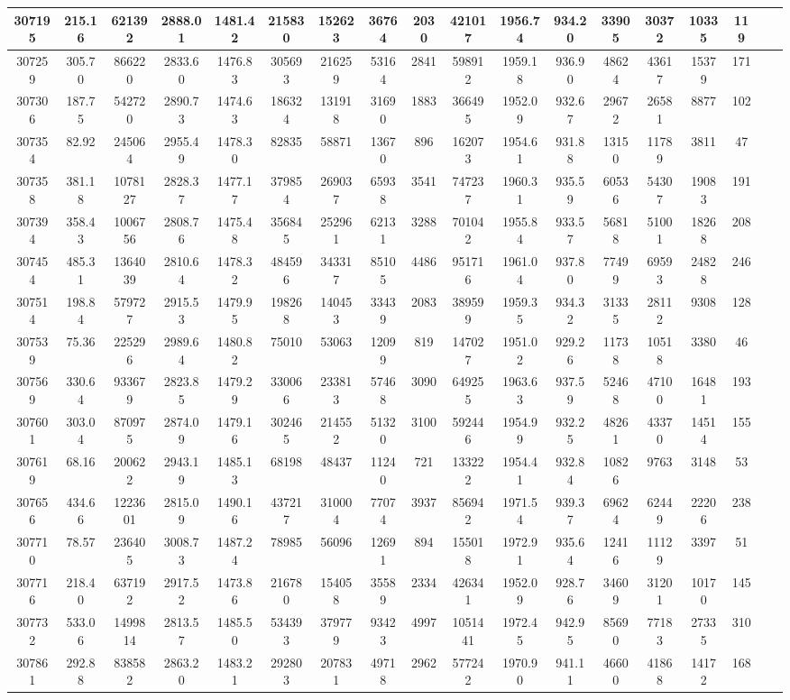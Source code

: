 \documentclass[10pt]{extarticle}
\begin{document}
\begin{longtable}{|c|c|c|c|c|c|c|c|c|c|c|c|c|c|c|c|c|c|}
\hline 
307195&215.16&621392&2888.01&1481.42&215830&152623&36764&2030&421017&1956.74&934.20&33905&30372&10335&119 \\ 
\hline 
307259&305.70&866220&2833.60&1476.83&305693&216259&53164&2841&598912&1959.18&936.90&48624&43617&15379&171 \\ 
\hline 
307306&187.75&542720&2890.73&1474.63&186324&131918&31690&1883&366495&1952.09&932.67&29672&26581&8877&102 \\ 
\hline 
307354&82.92&245064&2955.49&1478.30&82835&58871&13670&896&162073&1954.61&931.88&13150&11789&3811&47 \\ 
\hline 
307358&381.18&1078127&2828.37&1477.17&379854&269037&65938&3541&747237&1960.31&935.59&60536&54307&19083&191 \\ 
\hline 
307394&358.43&1006756&2808.76&1475.48&356845&252961&62131&3288&701042&1955.84&933.57&56818&51001&18268&208 \\ 
\hline 
307454&485.31&1364039&2810.64&1478.32&484596&343317&85105&4486&951716&1961.04&937.80&77499&69593&24828&246 \\ 
\hline 
307514&198.84&579727&2915.53&1479.95&198268&140453&33439&2083&389599&1959.35&934.32&31335&28112&9308&128 \\ 
\hline 
307539&75.36&225296&2989.64&1480.82&75010&53063&12099&819&147027&1951.02&929.26&11738&10518&3380&46 \\ 
\hline 
307569&330.64&933679&2823.85&1479.29&330066&233813&57468&3090&649255&1963.63&937.59&52468&47100&16481&193 \\ 
\hline 
307601&303.04&870975&2874.09&1479.16&302465&214552&51320&3100&592446&1954.99&932.25&48261&43370&14514&155 \\ 
\hline 
307619&68.16&200622&2943.19&1485.13&68198&48437&11240&721&133222&1954.41&932.84&10826&9763&3148&53 \\ 
\hline 
307656&434.66&1223601&2815.09&1490.16&437217&310004&77074&3937&856942&1971.54&939.37&69624&62449&22206&238 \\ 
\hline 
307710&78.57&236405&3008.73&1487.24&78985&56096&12691&894&155018&1972.91&935.64&12416&11129&3397&51 \\ 
\hline 
307716&218.40&637192&2917.52&1473.86&216780&154058&35589&2334&426341&1952.09&928.76&34609&31201&10170&145 \\ 
\hline 
307732&533.06&1499814&2813.57&1485.50&534393&379779&93423&4997&1051441&1972.45&942.95&85690&77183&27335&310 \\ 
\hline 
307861&292.88&838582&2863.20&1483.21&292803&207831&49718&2962&577242&1970.90&941.11&46600&41868&14172&168 \\ 

\end{longtable}
\end{document}
